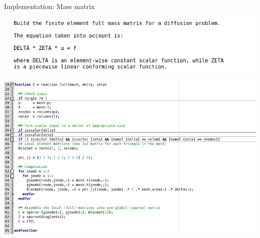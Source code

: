 \documentclass[aspectratio=54,xcolor=dvipsnames]{beamer}
\begin{document}
\begin{frame}{Implementation: Mass matrix}
    \begin{center}
        \begin{minipage}{0.55\textwidth}
            \centering
            \includegraphics[width=\textwidth]{Images/mass_help.png}
        \end{minipage}\hfill
        \begin{minipage}{0.88\textwidth}
            \centering
            \includegraphics[width=\textwidth]{Images/mass_matrix.png}
        \end{minipage}
    \end{center}
\end{frame}
\end{document}
